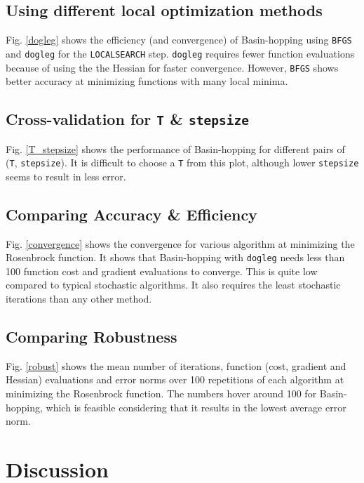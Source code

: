 \documentclass[conference]{IEEEtran}
\begin{document}
\subsection{Using different local optimization methods}

Fig. \ref{dogleg} shows the efficiency (and convergence) of Basin-hopping using \texttt{BFGS} and \texttt{dogleg} for the \texttt{LOCALSEARCH} step. \texttt{dogleg} requires fewer function evaluations because of using the the Hessian for faster convergence. However, \texttt{BFGS} shows better accuracy at minimizing functions with many local minima.

\subsection{Cross-validation for \texttt{T} \& \texttt{stepsize}}

Fig. \ref{T_stepsize} shows the performance of Basin-hopping for different pairs of (\texttt{T}, \texttt{stepsize}). It is difficult to choose a \texttt{T} from this plot, although lower \texttt{stepsize} seems to result in less error.

\subsection{Comparing Accuracy \& Efficiency}

Fig. \ref{convergence} shows the convergence for various algorithm at minimizing the Rosenbrock function. It shows that Basin-hopping with \texttt{dogleg} needs less than 100 function cost and gradient evaluations to converge. This is quite low compared to typical stochastic algorithms. It also requires the least stochastic iterations than any other method.

\subsection{Comparing Robustness}

Fig. \ref{robust} shows the mean number of iterations, function (cost, gradient and Hessian) evaluations and error norms over 100 repetitions of each algorithm at minimizing the Rosenbrock function. The numbers hover around 100 for Basin-hopping, which is feasible considering that it results in the lowest average error norm.

\section{Discussion}
\end{document}
